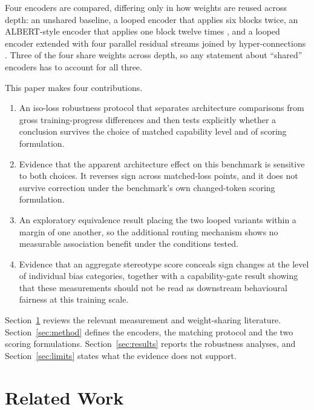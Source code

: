 \documentclass[sigconf,natbib=true,anonymous=true]{acmart}
\begin{document}
Four encoders are compared, differing only in how weights are reused across
depth: an unshared baseline, a looped encoder that applies six blocks twice, an
ALBERT-style encoder that applies one block twelve times \citep{lan2020albert},
and a looped encoder extended with four parallel residual streams joined by
hyper-connections \citep{zhu2025hyperconnections}. Three of the four share
weights across depth, so any statement about ``shared'' encoders has to account
for all three.

This paper makes four contributions.

\begin{enumerate}
\item An iso-loss robustness protocol that separates architecture comparisons
      from gross training-progress differences and then tests explicitly whether
      a conclusion survives the choice of matched capability level and of scoring
      formulation.
\item Evidence that the apparent architecture effect on this benchmark is
      sensitive to both choices. It reverses sign across matched-loss points, and
      it does not survive correction under the benchmark's own changed-token
      scoring formulation.
\item An exploratory equivalence result placing the two looped variants within a
      margin of one another, so the additional routing mechanism shows no
      measurable association benefit under the conditions tested.
\item Evidence that an aggregate stereotype score conceals sign changes at the
      level of individual bias categories, together with a capability-gate result
      showing that these measurements should not be read as downstream
      behavioural fairness at this training scale.
\end{enumerate}

Section~\ref{sec:related} reviews the relevant measurement and weight-sharing
literature. Section~\ref{sec:method} defines the encoders, the matching protocol
and the two scoring formulations. Section~\ref{sec:results} reports the
robustness analyses, and Section~\ref{sec:limits} states what the evidence does
not support.

\section{Related Work}
\label{sec:related}
\end{document}
